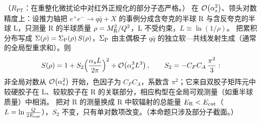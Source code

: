 \begin{proposition}\label{prop:jets-ngl}
（$R_{\mathrm{PT}}$：在重整化微扰论中对红外正规化的部分子态严格。）
在 $\mathcal{O}\!\left(\alpha_s^2\right)$、领头对数精度上：设推力轴把 $e^+e^-\to q\bar q+X$ 的事例分成含夸克的半球 R 与含反夸克的半球 L，只测量 R 的半球质量 $\rho=M_{\rm R}^2/Q^2$，L 不受约束，$L\equiv\ln(1/\rho)$。
把累积分布写成 $\Sigma(\rho)=\Sigma_{\rm P}(\rho)\,S(\rho)$，$\Sigma_{\rm P}$ 由主偶极子 $q\bar q$ 的独立软—共线发射生成（通常的全局型重求和）。则
\begin{equation}\label{eq:jets-S2}
S(\rho)=1+S_2\Big(\frac{\alpha_s L}{2\pi}\Big)^2+\mathcal{O}\!\left(\alpha_s^3L^3\right),\qquad S_2=-C_FC_A\,\frac{\pi^2}{3}:
\end{equation}
非全局对数从 $\mathcal{O}\!\left(\alpha_s^2\right)$ 开始，色因子为 $C_FC_A$，系数含 $\pi^2$；它来自双胶子矩阵元中较硬胶子在 L、较软胶子在 R 的关联部分，相应构型在全局可观测量（如重半球质量）中相消。
把对 R 的测量换成 R 中软辐射的总能量 $E_{\rm R}<E_{\rm cut}$（$L=\ln\frac{Q}{2E_{\rm cut}}$），$S_2$ 不变，只有单对数项改变。（本命题只涉及部分子截面。）
\end{proposition}


